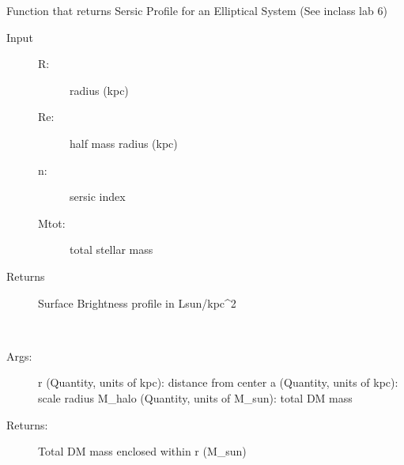 \documentclass[letterpaper,10pt,english]{sphinxmanual}
\begin{document}

\begin{fulllineitems}
\label{\detokenize{utilities:galaxy.utilities.sersic}}
Function that returns Sersic Profile for an Elliptical System
(See in\sphinxhyphen{}class lab 6)
\begin{description}
\item[{Input}] \leavevmode\begin{description}
\item[{R:}] \leavevmode
radius (kpc)

\item[{Re:}] \leavevmode
half mass radius (kpc)

\item[{n:}] \leavevmode
sersic index

\item[{Mtot:}] \leavevmode
total stellar mass

\end{description}

\item[{Returns}] \leavevmode
Surface Brightness profile in Lsun/kpc\textasciicircum{}2

\end{description}

\end{fulllineitems}


\begin{fulllineitems}
\label{\detokenize{utilities:galaxy.utilities.HernquistM}}~\begin{description}
\item[{Args:}] \leavevmode
r (Quantity, units of kpc): distance from center
a (Quantity, units of kpc): scale radius
M\_halo (Quantity, units of M\_sun): total DM mass

\item[{Returns:}] \leavevmode
Total DM mass enclosed within r (M\_sun)

\end{description}

\end{fulllineitems}
\end{document}
